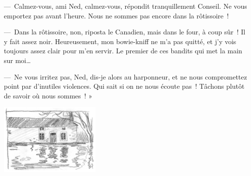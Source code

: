 \documentclass[petitlivre]{livrelitt}
\begin{document}
— Calmez-vous, ami Ned, calmez-vous, répondit tranquillement Conseil. Ne vous emportez pas avant l’heure. Nous ne sommes pas encore dans la rôtissoire !

— Dans la rôtissoire, non, riposta le Canadien, mais dans le four, à coup sûr ! Il y fait assez noir. Heureusement, mon bowie-kniff ne m’a pas quitté, et j’y vois toujours assez clair pour m’en servir. Le premier de ces bandits qui met la main sur moi…

— Ne vous irritez pas, Ned, dis-je alors au harponneur, et ne nous compromettez point par d’inutiles violences. Qui sait si on ne nous écoute pas ! Tâchons plutôt de savoir où nous sommes ! »

\includegraphics[width=5cm]{maison-etang.jpg}

\tableofcontents
\end{document}
